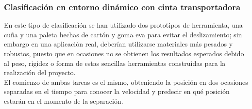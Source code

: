 \subsubsection{Clasificación en entorno dinámico con cinta transportadora}
\noindent En este tipo de clasificación se han utilizado dos prototipos de herramienta, una cuña y una paleta hechas de cartón y goma eva para evitar el deslizamiento; sin embargo en una aplicación real, deberían utilizarse materiales más pesados y robustos, puesto que en ocasiones no se obtienen los resultados esperados debido al peso, rigidez o forma de estas sencillas herramientas construidas para la realización del proyecto. \\

\noindent El comienzo de ambas tareas es el mismo, obteniendo la posición en dos ocasiones separadas en el tiempo para conocer la velocidad y predecir en qué posición estarán en el momento de la separación. \\

